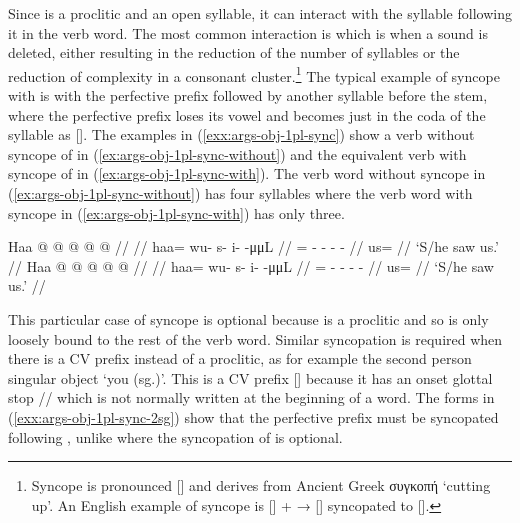 Since  is a proclitic and an open syllable, it can interact with the syllable following it in the verb word. The most common interaction is  which is when a sound is deleted, either resulting in the reduction of the number of syllables or the reduction of complexity in a consonant cluster.\footnote{Syncope is pronounced [] and derives from Ancient Greek συγκοπή  ‘cutting up’. An English example of syncope is  [] +  →  [] syncopated to  [].} The typical example of syncope with  is with the perfective prefix  followed by another syllable before the stem, where the perfective prefix loses its vowel and becomes just  in the coda of the  syllable as []. The examples in (\ref{exx:args-obj-1pl-sync}) show a verb without syncope of  in (\ref{ex:args-obj-1pl-sync-without}) and the equivalent verb with syncope of  in (\ref{ex:args-obj-1pl-sync-with}). The verb word without syncope in (\ref{ex:args-obj-1pl-sync-without}) has four syllables where the verb word with syncope in (\ref{ex:args-obj-1pl-sync-with}) has only three.

\pex\label{exx:args-obj-1pl-sync}%
\a\label{ex:args-obj-1pl-sync-without}%
%
\begingl
	\gla	Haa @  @ {} @ {} @ {} @ {} //
	\glp	\llap{[}\rlap{\ipa{hàː.\gm{wù}.sì.ˈtʰìːn}]} {} {} {} {} {} //
	\glb	haa= wu- s- i-  -μμL //
	\glc	{}= - - -  - //
	\gld	us=  {} {} {} {} //
	\glft	‘S/he saw us.’
		//
\endgl
\a\label{ex:args-obj-1pl-sync-with}%
%
\begingl
	\gla	Haa @  @ {} @ {} @ {} @ {} //
	\glp	\llap{[}\rlap{\ipa{hàː\gm{w}.sì.ˈtʰìːn}]} {} {} {} {} {} //
	\glb	haa= wu- s- i-  -μμL //
	\glc	{}= - - -  - //
	\gld	us=  {} {} {} {} //
	\glft	‘S/he saw us.’
		//
\endgl
\xe

This particular case of syncope is optional because  is a proclitic and so is only loosely bound to the rest of the verb word. Similar syncopation is required when there is a CV prefix instead of a proclitic, as for example the second person singular object  ‘you (sg.)’. This is a CV prefix [] because it has an onset glottal stop // which is not normally written at the beginning of a word. The forms in (\ref{exx:args-obj-1pl-sync-2sg}) show that the perfective  prefix must be syncopated following , unlike  where the syncopation of  is optional.

